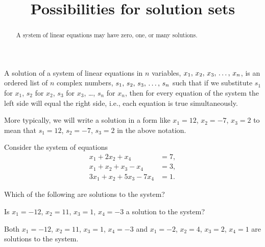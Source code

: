 \documentclass{ximera}
\title{Possibilities for solution sets}
\begin{document}
\begin{abstract}
  A system of linear equations may have zero, one, or many solutions.
\end{abstract}
\maketitle

\begin{definition}
A solution of a system of linear equations in $n$ variables, ${x}_{1},\,{x}_{2},\,{x}_{3},\,\ldots,\,{x}_{n}$, is an ordered list of $n$ complex numbers, ${s}_{1},\,{s}_{2},\,{s}_{3},\,\ldots,\,{s}_{n}$ such that if we substitute $s_1$ for $x_1$, $s_2$ for $x_2$, $s_3$ for $x_3$, \ldots, $s_n$ for $x_n$,  then for every equation of the system the left side will equal the right side, i.e., each equation is true simultaneously.
\end{definition}

More typically, we will write a solution in a form like $x_1=12$, $x_2=-7$, $x_3=2$ to mean that $s_1=12$, $s_2=-7$, $s_3=2$ in the above notation.

\begin{exercise}
Consider the system of equations
\begin{align*}
x_1+2x_2 + x_4&= 7,\\
x_1+x_2+x_3-x_4&=3,\\
3x_1+x_2+5x_3-7x_4&=1.
\end{align*}

\begin{question}
Which of the following are solutions to the system?
\begin{multipleChoice}
\end{multipleChoice}
\end{question}

\begin{question}
Is $x_{1}=-12$, $x_{2}=11$, $x_{3}=1$, $x_{4}=-3$ a solution to the system?
\begin{multipleChoice}
\end{multipleChoice}

\begin{feedback}
Both $x_{1}=-12$, $x_{2}=11$, $x_{3}=1$, $x_{4}=-3$ and $x_{1}=-2$, $x_{2}=4$, $x_{3}=2$, $x_{4}=1$ are solutions to the system.
\end{feedback}
\end{question}

\end{exercise}
\end{document}
